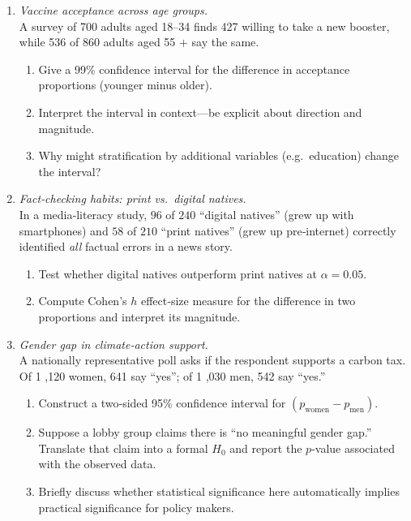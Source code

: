 \documentclass[11pt]{article}
\begin{document}
\begin{enumerate}[label=\textbf{Q\,\arabic*:}, start=11, left=0pt]
\item  \emph{Vaccine acceptance across age groups.} \\
      A survey of 700 adults aged 18–34 finds 427 willing to take a new booster, while
      536 of 860 adults aged 55 + say the same.
      \begin{enumerate}[label=(\alph*)]
          \item Give a 99\% confidence interval for the difference in acceptance proportions (younger minus older).
          \item Interpret the interval in context—be explicit about direction and magnitude.
          \item Why might stratification by additional variables (e.g.\ education) change the interval?
      \end{enumerate}

\item  \emph{Fact‑checking habits: print vs.\ digital natives.} \\
      In a media‑literacy study, $96$ of $240$ “digital natives” (grew up with smartphones) and $58$ of $210$ “print natives” (grew up pre‑internet)
      correctly identified \emph{all} factual errors in a news story.
      \begin{enumerate}[label=(\alph*)]
          \item Test whether digital natives outperform print natives at $\alpha=0.05$.
          \item Compute Cohen’s $h$ effect‑size measure for the difference in two proportions and interpret its magnitude.
      \end{enumerate}

\item  \emph{Gender gap in climate‑action support.} \\
      A nationally representative poll asks if the respondent supports a carbon tax.
      Of 1 ,120 women, 641 say “yes”; of 1 ,030 men, 542 say “yes.”
      \begin{enumerate}[label=(\alph*)]
          \item Construct a two‑sided 95\% confidence interval for $(p_{\text{women}}-p_{\text{men}})$.
          \item Suppose a lobby group claims there is “no meaningful gender gap.”
                Translate that claim into a formal $H_0$ and report the $p$‑value associated with the observed data.
          \item Briefly discuss whether statistical significance here automatically implies practical significance for policy makers.
      \end{enumerate}

\end{enumerate}
\end{document}
